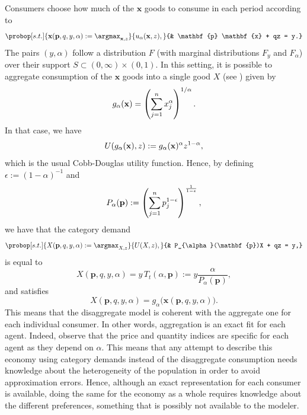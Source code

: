 \documentclass[english, a4paper, 12pt]{article}
\begin{document}
Consumers choose how much of the $\mathbf{x}$ goods to consume in each period according to
	\begin{equation} \label{eq:probdisagg}
		\probop[s.t.]{\mathbf{x}(\mathbf{p}, q, y, \alpha) 
			:= \argmax_{\mathbf{x}, z}}{u_{\alpha}(\mathbf{x}, z),}
				{&	\mathbf{p} \mathbf{x} + qz = y.}\vspace{-1ex}
	\end{equation}
The pairs $(y,\alpha)$ follow a distribution $F$ (with marginal distributions $F_{y}$ and $F_{\alpha}$) over their support $S \subset (0,\infty) \times  (0,1)$. In this setting, it is possible to aggregate consumption of the $\mathbf{x}$ goods into a single good $X$ (see ) given by 
	\begin{equation} \label{eq:qtyindex}
		g_{\alpha}(\mathbf{x}) = \left(\sum_{j=1}^{n} x_{j}^{\alpha}\right)^{1/\alpha}.\vspace{-1ex}
	\end{equation}
In that case, we have
	\begin{equation} \label{eq:utilagg}
		U(g_{\alpha}(\mathbf{x}), z) := g_{\alpha}(\mathbf{x})^{\alpha}z^{1-\alpha},\vspace{-1ex}
	\end{equation}
which is the usual Cobb-Douglas utility function. Hence, by defining $\epsilon := (1-\alpha)^{-1}$ and
	\begin{equation} \label{eq:priceindex}
		P_{\alpha}(\mathbf{p}) :=  \left( \sum_{j=1}^{n} p_{j}^{1-\epsilon} \right)^{\frac{1}{1-\epsilon}},\vspace{-1ex}
	\end{equation}
we have that the category demand
	\begin{equation} \label{eq:probagg}
		\probop[s.t.]{X(\mathbf{p}, q, y, \alpha) := \argmax_{X, z}}{U(X,z),}
										{&	P_{\alpha}(\mathbf{p})X + qz = y,}
	\end{equation}
is equal to 
	\begin{equation} \label{eq:Xformula}
		X(\mathbf{p}, q,y,\alpha) = y\,T_{t}(\alpha, \mathbf{p}) := y \frac{\alpha}{P_{\alpha}(\mathbf{p})},
	\end{equation}
and satisfies 
	\begin{equation} \label{eq:aggequality}
		X(\mathbf{p}, q, y, \alpha) = g_{\alpha}\big(\mathbf{x}(\mathbf{p}, q, y, \alpha)\big).
	\end{equation}
This means that the disaggregate model is coherent with the aggregate one for each individual consumer. In other words, aggregation is an exact fit for each agent. Indeed, observe that the price and quantity indices are specific for each agent as they depend on $\alpha$. This means that any attempt to describe this economy using category demands instead of the disaggregate consumption needs knowledge about the heterogeneity of the population in order to avoid approximation errors. Hence, although an exact representation for each consumer is available, doing the same for the economy as a whole requires knowledge about the different preferences, something that is possibly not available to the modeler.
\end{document}
